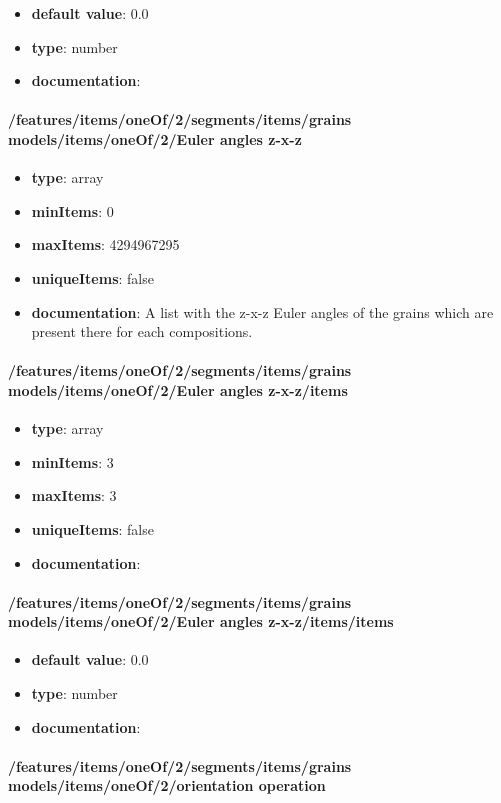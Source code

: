 \begin{itemize}\item {\bf default value}: 0.0
\item {\bf type}: number
\item {\bf documentation}: 
\end{itemize}\paragraph{/features/items/oneOf/2/segments/items/grains models/items/oneOf/2/Euler angles z-x-z}
\begin{itemize}\item {\bf type}: array
\item {\bf minItems}: 0
\item {\bf maxItems}: 4294967295
\item {\bf uniqueItems}: false
\item {\bf documentation}: A list with the z-x-z Euler angles of the grains which are present there for each compositions.
\end{itemize}\paragraph{/features/items/oneOf/2/segments/items/grains models/items/oneOf/2/Euler angles z-x-z/items}
\begin{itemize}\item {\bf type}: array
\item {\bf minItems}: 3
\item {\bf maxItems}: 3
\item {\bf uniqueItems}: false
\item {\bf documentation}: 
\end{itemize}\paragraph{/features/items/oneOf/2/segments/items/grains models/items/oneOf/2/Euler angles z-x-z/items/items}
\begin{itemize}\item {\bf default value}: 0.0
\item {\bf type}: number
\item {\bf documentation}: 
\end{itemize}\paragraph{/features/items/oneOf/2/segments/items/grains models/items/oneOf/2/orientation operation}
